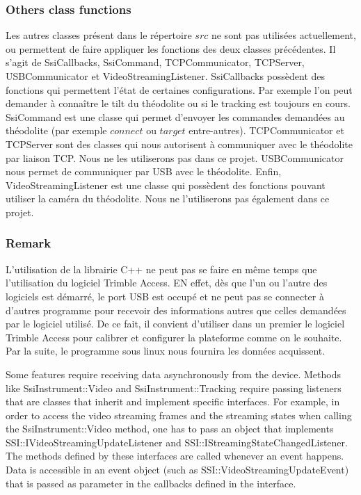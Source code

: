 \documentclass[10pt,letterpaper,oneside]{article}
\begin{document}
\subsubsection{Others class functions}

Les autres classes présent dans le répertoire $src$ ne sont pas utilisées actuellement, ou permettent de faire appliquer les fonctions des deux classes précédentes.
Il s'agit de SsiCallbacks, SsiCommand, TCPCommunicator, TCPServer, USBCommunicator et
VideoStreamingListener.
SsiCallbacks possèdent des fonctions qui permettent l'état de certaines configurations.
Par exemple l'on peut demander à connaître le tilt du théodolite ou si le tracking est toujours en cours.
SsiCommand est une classe qui permet d'envoyer les commandes demandées au théodolite (par exemple $connect$ ou $target$ entre-autres).
TCPCommunicator et TCPServer sont des classes qui nous autorisent à communiquer avec le théodolite par liaison TCP.
Nous ne les utiliserons pas dans ce projet.
USBCommunicator nous permet de communiquer par USB avec le théodolite.
Enfin, VideoStreamingListener est une classe qui possèdent des fonctions pouvant utiliser la caméra du théodolite.
Nous ne l'utiliserons pas également dans ce projet.

\subsubsection{Remark}

L'utilisation de la librairie C++ ne peut pas se faire en même temps que l'utilisation du logiciel Trimble Access.
EN effet, dès que l'un ou l'autre des logiciels est démarré, le port USB est occupé et ne peut pas se connecter à d'autres programme pour recevoir des informations autres que celles demandées par le logiciel utilisé.
De ce fait, il convient d'utiliser dans un premier le logiciel Trimble Access pour calibrer et configurer la plateforme comme on le souhaite.
Par la suite, le programme sous linux nous fournira les données acquissent.

Some features require receiving data asynchronously from the device. 
Methods like SsiInstrument::Video and SsiInstrument::Tracking require passing listeners that are classes that inherit and implement specific interfaces. 
For example, in order to access the video streaming frames and the streaming states when calling the SsiInstrument::Video method, one has to pass an object that implements SSI::IVideoStreamingUpdateListener and SSI::IStreamingStateChangedListener. 
The methods defined by these interfaces are called whenever an event happens. 
Data is accessible in an event object (such as SSI::VideoStreamingUpdateEvent) that is passed as parameter in the callbacks defined in the interface.
\end{document}

